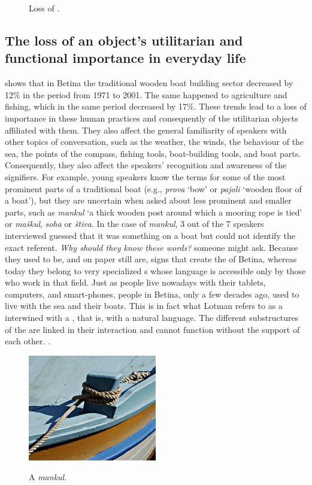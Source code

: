 \documentclass[output=paper]{LSP/langsci}
\begin{document}
\begin{figure}

\caption{Loss of .}
\label{fig:2}
\end{figure}


\subsection{The loss of an object’s utilitarian and functional importance in everyday life}
 shows that in Betina the traditional wooden boat building sector decreased by 12\% in the period from 1971 to 2001. The same happened to agriculture and fishing, which in the same period decreased by 17\%. These trends lead to a loss of importance in these human practices and consequently of the utilitarian objects affiliated with them. They also affect the general familiarity of speakers with other topics of conversation, such as the weather, the winds, the behaviour of the sea, the points of the compass, fishing tools, boat-building tools, and boat parts. Consequently, they also affect the speakers’ recognition and awareness of the signifiers. For example, young speakers know the terms for some of the most prominent parts of a traditional boat (e.g.,  \textit{prova} `bow' or \textit{pajoli} `wooden floor of a boat'), but they are uncertain when asked about less prominent and smaller parts, such as \textit{mankul} `a thick wooden post around which a mooring rope is tied' or \textit{maškul}, \textit{soha} or \textit{štiva}. In the case of \textit{mankul}, 3 out of the 7 speakers interviewed guessed that it was something on a boat but could not identify the exact referent. \textit{Why should they know these words?} someone might ask. Because they used to be, and on paper still are, signs that create the  of Betina, whereas today they belong to very specialized s whose language is accessible only by those who work in that field. Just as people live nowadays with their tablets, computers, and smart-phones, people in Betina, only a few decades ago, used to live with the sea and their boats. This is in fact what Lotman refers to as a  interwined with a , that is, with a natural language. The different substructures of the  are linked in their interaction and cannot function without the support of each other. \citep[219]{lotman_semiosphere_1985}.


\begin{figure}
\includegraphics[width=0.5\textwidth]{illustrations/skevin_fig3_mankul}
\label{fig3_mankul}
\caption{A \textit{mankul}.}
\end{figure}
\end{document}
